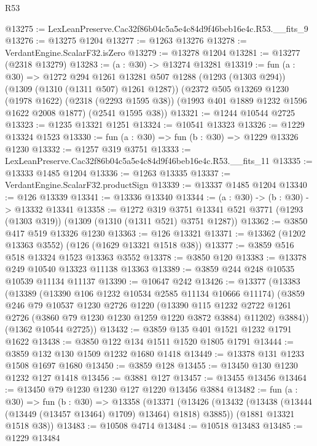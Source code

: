 \begin{lexlean}{R53}
\begin{coremodule}
@13275 := LexLeanPreserve.Cac32f86b04c5a5e4c84d9f46beb16e4c.R53.__fits_9
@13276 := @13275 @1204
@13277 := @1263 @13276
@13278 := VerdantEngine.ScalarF32.isZero
@13279 := @13278 @1204
@13281 := @13277 (@2318 @13279)
@13283 := (a : @30) -> @13274 @13281
@13319 := fun (a : @30) =>
  @1272
    @294
    @1261
    @13281
    @507
    @1288
    (@1293 (@1303 @294))
    (@1309 (@1310 (@1311 @507) @1261 @1287))
    (@2372
      @505
      @13269
      @1230
      (@1978 @1622)
      (@2318 (@2293 @1595 @38))
      (@1993 @401 @1889 @1232 @1596 @1622 @2008 @1877)
      (@2541 @1595 @38))
@13321 := @1244 @10544 @2725
@13323 := @1235 @13321 @1251
@13324 := @10541 @13323
@13326 := @1229 @13324 @1523
@13330 := fun (a : @30) => fun (b : @30) => @1229 @13326 @1230
@13332 := @1257 @319 @3751
@13333 := LexLeanPreserve.Cac32f86b04c5a5e4c84d9f46beb16e4c.R53.__fits_11
@13335 := @13333 @1485 @1204
@13336 := @1263 @13335
@13337 := VerdantEngine.ScalarF32.productSign
@13339 := @13337 @1485 @1204
@13340 := @126 @13339
@13341 := @13336 @13340
@13344 := (a : @30) -> (b : @30) -> @13332 @13341
@13358 := @1272
    @319
    @3751
    @13341
    @521
    @3771
    (@1293 (@1303 @319))
    (@1309 (@1310 (@1311 @521) @3751 @1287))
@13362 := @3850 @417 @519 @13326 @1230
@13363 := @126 @13321
@13371 := @13362 (@1202 @13363 @3552) (@126 (@1629 @13321 @1518 @38))
@13377 := @3859 @516 @518 @13324 @1523 @13363 @3552
@13378 := @3850 @120
@13383 := @13378 @249 @10540 @13323 @11138 @13363
@13389 := @3859 @244 @248 @10535 @10539 @11134 @11137
@13390 := @10647 @242
@13426 := @13377
    (@13383
      (@13389
        (@13390 @106 @1232 @10534 @2585 @11134 @10666 @11174)
        (@3859
          @246
          @79
          @10537
          @1230
          @2726
          @1220
          (@13390
            @115
            @1232
            @2722
            @1261
            @2726
            (@3860 @79 @1230 @1230 @1259 @1220 @3872 @3884)
            @11202)
          @3884))
      (@1362 @10544 @2725))
@13432 := @3859 @135 @401 @1521 @1232 @1791 @1622
@13438 := @3850 @122 @134 @1511 @1520 @1805 @1791
@13444 := @3859 @132 @130 @1509 @1232 @1680 @1418
@13449 := @13378 @131 @1233 @1508 @1697 @1680
@13450 := @3859 @128
@13455 := @13450 @130 @1230 @1232 @127 @1418
@13456 := @3881 @127
@13457 := @13455 @13456
@13464 := @13450 @79 @1230 @1230 @127 @1220 @13456 @3884
@13482 := fun (a : @30) =>
  fun (b : @30) =>
  @13358
    (@13371
      (@13426 (@13432 (@13438 (@13444 (@13449 (@13457 @13464) @1709) @13464) @1818) @3885))
      (@1881 @13321 @1518 @38))
@13483 := @10508 @4714
@13484 := @10518 @13483
@13485 := @1229 @13484

\end{coremodule}
\end{lexlean}

